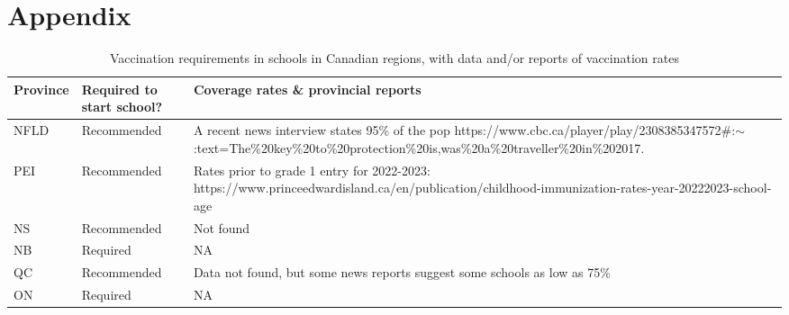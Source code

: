 \documentclass[12pt,a4paper]{article}
\begin{document}
\clearpage


\appendix
\section{Appendix}
\renewcommand\thefigure{\thesection.\arabic{figure}}    
\renewcommand\thetable{\thesection.\arabic{table}}    

\begin{table}[h!]
  \centering

  \caption[Vaccination requirements by province]{Vaccination requirements in schools in Canadian regions, with data and/or reports of vaccination rates}
  \label{tab:vaxrequire}
  \begin{tabular}{lp{3cm}p{10cm}}
	  \bf{Province} & \bf{Required to start school?} & \bf{Coverage rates \& provincial reports}                                                                                                                                                \\ \hline
NFLD     & Recommended               & A recent news interview states 95\% of the pop https://www.cbc.ca/player/play/2308385347572\#:$\sim$:text=The\%20key\%20to\%20protection\%20is,was\%20a\%20traveller\%20in\%202017. \\ \hline
PEI      & Recommended               & Rates prior to grade 1 entry for 2022-2023: https://www.princeedwardisland.ca/en/publication/childhood-immunization-rates-year-20222023-school-age                                  \\ \hline
NS       & Recommended               & Not found                                                                                                                                                                      \\ \hline
NB       & Required                  & NA                                                                                                                                                                                  \\ \hline
QC       & Recommended               & Data not found, but some news reports suggest some schools as low as 75\%                                                                                                                \\ \hline
ON       & Required                  & NA                                                                                                                                                                                  \\ \hline

\end{tabular}
\end{table}
\end{document}
